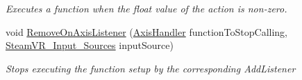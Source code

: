 \begin{DoxyCompactItemize}
\begin{DoxyCompactList}\small\item\em Executes a function when the float value of the action is non-\/zero. \end{DoxyCompactList}\item 
void \mbox{\hyperlink{class_valve_1_1_v_r_1_1_steam_v_r___action___single_a39aed374b5f84383e67dd25b592ac48e}{Remove\+On\+Axis\+Listener}} (\mbox{\hyperlink{class_valve_1_1_v_r_1_1_steam_v_r___action___single_a4193937cd6b6e4b7248374bc5636f6fd}{Axis\+Handler}} function\+To\+Stop\+Calling, \mbox{\hyperlink{namespace_valve_1_1_v_r_a82e5bf501cc3aa155444ee3f0662853f}{Steam\+V\+R\+\_\+\+Input\+\_\+\+Sources}} input\+Source)
\begin{DoxyCompactList}\small\item\em Stops executing the function setup by the corresponding Add\+Listener \end{DoxyCompactList}\end{DoxyCompactItemize}
